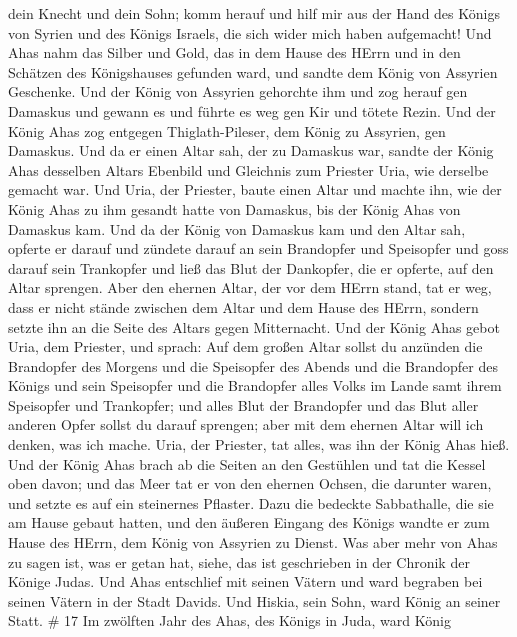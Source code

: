 dein Knecht und dein Sohn; komm herauf und hilf mir aus der Hand des
Königs von Syrien und des Königs Israels, die sich wider mich haben
aufgemacht!  Und Ahas nahm das Silber und Gold, das in dem
Hause des HErrn und in den Schätzen des Königshauses gefunden ward, und
sandte dem König von Assyrien Geschenke.  Und der König von
Assyrien gehorchte ihm und zog herauf gen Damaskus und gewann es und
führte es weg gen Kir und tötete Rezin.  Und der König Ahas
zog entgegen Thiglath-Pileser, dem König zu Assyrien, gen Damaskus. Und
da er einen Altar sah, der zu Damaskus war, sandte der König Ahas
desselben Altars Ebenbild und Gleichnis zum Priester Uria, wie derselbe
gemacht war.  Und Uria, der Priester, baute einen Altar und
machte ihn, wie der König Ahas zu ihm gesandt hatte von Damaskus, bis
der König Ahas von Damaskus kam.  Und da der König von
Damaskus kam und den Altar sah, opferte er darauf  und
zündete darauf an sein Brandopfer und Speisopfer und goss darauf sein
Trankopfer und ließ das Blut der Dankopfer, die er opferte, auf den
Altar sprengen.  Aber den ehernen Altar, der vor dem HErrn
stand, tat er weg, dass er nicht stände zwischen dem Altar und dem Hause
des HErrn, sondern setzte ihn an die Seite des Altars gegen Mitternacht.
 Und der König Ahas gebot Uria, dem Priester, und sprach:
Auf dem großen Altar sollst du anzünden die Brandopfer des Morgens und
die Speisopfer des Abends und die Brandopfer des Königs und sein
Speisopfer und die Brandopfer alles Volks im Lande samt ihrem Speisopfer
und Trankopfer; und alles Blut der Brandopfer und das Blut aller anderen
Opfer sollst du darauf sprengen; aber mit dem ehernen Altar will ich
denken, was ich mache.  Uria, der Priester, tat alles, was
ihn der König Ahas hieß.  Und der König Ahas brach ab die
Seiten an den Gestühlen und tat die Kessel oben davon; und das Meer tat
er von den ehernen Ochsen, die darunter waren, und setzte es auf ein
steinernes Pflaster.  Dazu die bedeckte Sabbathalle, die
sie am Hause gebaut hatten, und den äußeren Eingang des Königs wandte er
zum Hause des HErrn, dem König von Assyrien zu Dienst.  Was
aber mehr von Ahas zu sagen ist, was er getan hat, siehe, das ist
geschrieben in der Chronik der Könige Judas.  Und Ahas
entschlief mit seinen Vätern und ward begraben bei seinen Vätern in der
Stadt Davids. Und Hiskia, sein Sohn, ward König an seiner Statt. \# 17
 Im zwölften Jahr des Ahas, des Königs in Juda, ward König
